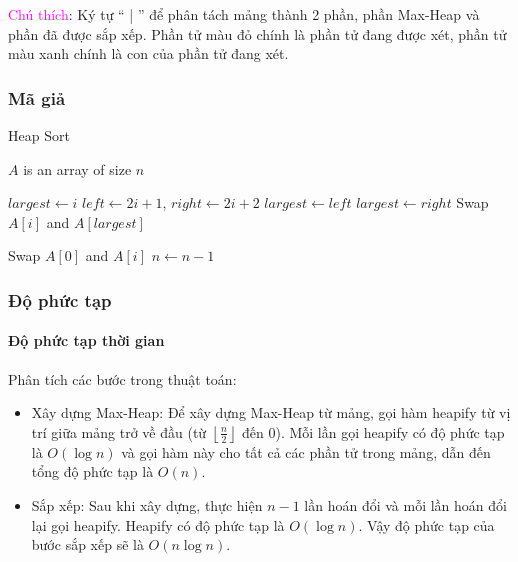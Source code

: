 \textcolor{magenta}{Chú thích}: Ký tự “ | ” để phân tách mảng thành 2 phần, phần Max-Heap và phần đã được sắp xếp. Phần tử màu đỏ chính là phần tử đang được xét, phần tử màu xanh chính là con của phần tử đang xét. 


\subsubsection{Mã giả}
 
\begin{algorithm}[H]
\caption{Heap Sort}
\label{alg:heap-sort}
\begin{algorithmic}

\Require $A$ is an array of size $n$

\State $largest \gets i$
\State $left \gets 2i + 1$, $right \gets 2i + 2$
    \State $largest \gets left$
\EndIf
{}
    \State $largest \gets right$
\EndIf
{}
    \State Swap $A[i]$ and $A[largest]$
\EndIf
\EndFunction \State

\EndFor
\EndFunction \State


\State {} 
    \State Swap $A[0]$ and $A[i]$ 
    \State $n \gets n - 1$ 
    \State {} 
\EndFor
\EndFunction


\end{algorithmic}
\end{algorithm}


\subsubsection{Độ phức tạp}
\paragraph{Độ phức tạp thời gian} Phân tích các bước trong thuật toán:
\begin{itemize}
    \item Xây dựng Max-Heap: Để xây dựng Max-Heap từ mảng, gọi hàm heapify từ vị trí giữa mảng trở về đầu (từ $\left\lfloor \frac{n}{2} \right\rfloor$ đến 0). Mỗi lần gọi heapify có độ phức tạp là $O(\log{n})$ và gọi hàm này cho tất cả các phần tử trong mảng, dẫn đến tổng độ phức tạp là $O(n)$.
    \item Sắp xếp: Sau khi xây dựng, thực hiện $n-1$ lần hoán đổi và mỗi lần hoán đổi lại gọi heapify. Heapify có độ phức tạp là $O(\log{n})$. Vậy độ phức tạp của bước sắp xếp sẽ là $O(n\log{n})$.
\end{itemize}

